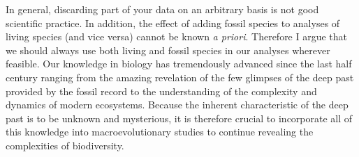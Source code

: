 In general, discarding part of your data on an arbitrary basis is not good scientific practice. 
In addition, the effect of adding fossil species to analyses of living species (and vice versa) cannot be known \textit{a priori}.
Therefore I argue that we should always use both living and fossil species in our analyses wherever feasible.
Our knowledge in biology has tremendously advanced since the last half century ranging from the amazing revelation of the few glimpses of the deep past provided by the fossil record to the understanding of the complexity and dynamics of modern ecosystems.
Because the inherent characteristic of the deep past is to be unknown and mysterious, it is therefore crucial to incorporate all of this knowledge into macroevolutionary studies to continue revealing the complexities of biodiversity.

%